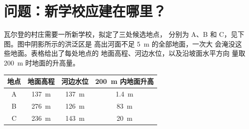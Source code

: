\section{问题：新学校应建在哪里？}

\begin{problem}
\label{pb:g9:natural-risks:1}
瓦尔登的村庄需要一所新学校，拟定了三处候选地点，
分别为 A、B 和 C，见下图。图中阴影所示的洪泛区是
高出河面不足 \qty{5}{m} 的全部地面，一次大
会淹没这些地面。表格给出了每处地点的
地面高程、河边水位，以及沿坡面水平方向
量取 \qty{200}{m} 时地面的升高量。

\begin{center}
{\small
\begin{tabular}{|c|c|c|c|}
\hline
地点 & 地面高程 & 河边水位 & \qty{200}{m} 内地面升高 \\
\hline
A & \qty{137}{m} & \qty{137}{m} & \qty{1.4}{m} \\
B & \qty{276}{m} & \qty{126}{m} & \qty{83}{m} \\
C & \qty{236}{m} & \qty{143}{m} & \qty{20}{m} \\
\hline
\end{tabular}}
\end{center}


\end{problem}
